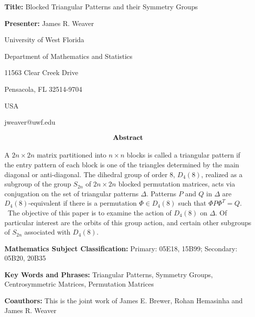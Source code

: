 \documentclass{article}
\begin{document}
\textbf{Title: }Blocked Triangular Patterns and their Symmetry Groups

\textbf{Presenter: }James R. Weaver

University of West Florida

Department of Mathematics and Statistics

11563 Clear Creek Drive

Pensacola, FL 32514-9704

USA

jweaver@uwf.edu

\[
\text{\textbf{Abstract}} 
\]

A $2n\times 2n$ matrix partitioned into $n\times n$ blocks is called a
triangular pattern if the entry pattern of each block is one of the
triangles determined by the main diagonal or anti-diagonal. The dihedral
group of order $8$, $D_{4}(8)$, realized as a subgroup of the group $S_{2n}$
of $2n\times 2n$ blocked permutation matrices, acts via conjugation on the
set of triangular patterns $\Delta $. Patterns $P$ and $Q$ in $\Delta $ are $%
D_{4}(8)$-equivalent if there is a permutation $\Phi \in D_{4}(8)$ such that 
$\Phi P\Phi ^{T}=Q$. \ The objective of this paper is to examine the action
of $D_{4}(8)$ on $\Delta $. Of particular interest are the orbits of this
group action, and certain other subgroups of $S_{2n}$ associated with $%
D_{4}(8)$.

\textbf{Mathematics Subject Classification: }Primary: 05E18, 15B99;
Secondary: 05B20, 20B35

\textbf{Key Words and Phrases: }Triangular Patterns, Symmetry Groups,
Centrosymmetric Matrices, Permutation Matrices

\textbf{Coauthors: }This is the joint work of James E. Brewer, Rohan
Hemasinha and James R. Weaver
\end{document}
